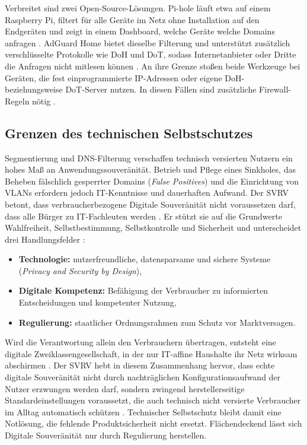 Verbreitet sind zwei Open-Source-Lösungen. Pi-hole läuft etwa auf einem
Raspberry Pi, filtert für alle Geräte im Netz ohne Installation auf den
Endgeräten und zeigt in einem Dashboard, welche Geräte welche Domains anfragen
\cite{noauthor_overview_nodate}. AdGuard Home bietet dieselbe Filterung und unterstützt
zusätzlich verschlüsselte Protokolle wie \gls{DoH} und
\gls{DoT}, sodass Internetanbieter oder Dritte die Anfragen nicht
mitlesen können \cite{noauthor_uberblick_nodate}. An ihre Grenze stoßen beide Werkzeuge bei
Geräten, die fest einprogrammierte IP-Adressen oder eigene \gls{DoH}- beziehungsweise \gls{DoT}-Server nutzen.
In diesen Fällen sind zusätzliche Firewall-Regeln nötig \cite{noauthor_uberblick_nodate}.

\subsection{Grenzen des technischen Selbstschutzes}
Segmentierung und \gls{DNS}-Filterung verschaffen technisch versierten Nutzern ein
hohes Maß an Anwendungssouveränität. Betrieb und Pflege eines Sinkholes, das
Beheben fälschlich gesperrter Domains (\emph{False Positives}) und die
Einrichtung von \glspl{VLAN} erfordern jedoch IT-Kenntnisse und dauerhaften Aufwand.
Der \gls{SVRV} betont, dass verbraucherbezogene Digitale Souveränität nicht
voraussetzen darf, dass alle Bürger zu IT-Fachleuten werden \cite[S. 24, ff.]{noauthor_digitale_2017}. Er stützt sie auf die Grundwerte Wahlfreiheit,
Selbstbestimmung, Selbstkontrolle und Sicherheit und unterscheidet drei Handlungsfelder \cite[S. 18]{noauthor_digitale_2017}:
\begin{itemize}
  \item \textbf{Technologie:} nutzerfreundliche, datensparsame und sichere
        Systeme (\emph{Privacy and Security by Design}),
  \item \textbf{Digitale Kompetenz:} Befähigung der Verbraucher zu
        informierten Entscheidungen und kompetenter Nutzung,
  \item \textbf{Regulierung:} staatlicher Ordnungsrahmen zum Schutz vor
        Marktversagen.
\end{itemize}

Wird die Verantwortung allein den Verbrauchern übertragen, entsteht eine
digitale Zweiklassengesellschaft, in der nur IT-affine Haushalte ihr Netz
wirksam abschirmen \cite[S. 31]{noauthor_digitale_2017}. Der SVRV hebt in diesem Zusammenhang hervor, 
dass echte digitale Souveränität nicht durch nachträglichen Konfigurationsaufwand der Nutzer erzwungen werden darf, 
sondern zwingend herstellerseitige Standardeinstellungen voraussetzt, 
die auch technisch nicht versierte Verbraucher im Alltag automatisch schützen \cite[S. 18]{noauthor_digitale_2017}.
Technischer Selbstschutz bleibt damit eine Notlösung, die fehlende Produktsicherheit nicht ersetzt. 
Flächendeckend lässt sich Digitale Souveränität nur durch Regulierung herstellen.

